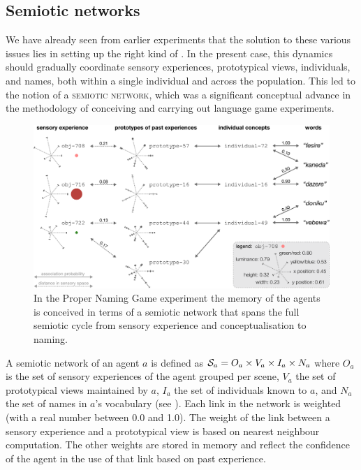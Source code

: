 \subsection{Semiotic networks}
We have already seen from earlier experiments that the solution to these various issues lies in setting up
the right kind of . In the present case, this dynamics should gradually coordinate
sensory experiences, prototypical views, individuals, 
and names, both within a single individual and across the
population. This led to the notion of a {\scshape semiotic network}, which was a significant conceptual advance 
in the methodology of conceiving and carrying out language game experiments.

\begin{figure}[b]
  \centerline{\includegraphics[width=.95\textwidth]{chap10/figs/prototypes-identifiers-words.pdf}}
\caption{\label{fig:prototypes-identifiers-words}In the Proper Naming Game experiment the memory of the agents is conceived in terms of a semiotic network that 
spans the full semiotic cycle from sensory experience and conceptualisation to naming.}
\end{figure}

A semiotic network of an agent $a$ is defined as 
${\cal S}_a = O_a \times V_a \times I_a \times N_a$ where $O_a$ is the set of
sensory experiences of the agent grouped per scene, $V_a$ the set of
prototypical views maintained by $a$, $I_a$ the set of individuals
 known to $a$, and $N_a$ the set of names in $a$'s vocabulary
(see 
). Each link in the network is weighted (with a real number between 0.0 and 1.0). The
weight of the link between a sensory experience and a prototypical
view is based on nearest neighbour computation. The other weights are
stored in memory and reflect the confidence of the agent in the use of
that link based on past experience. 


